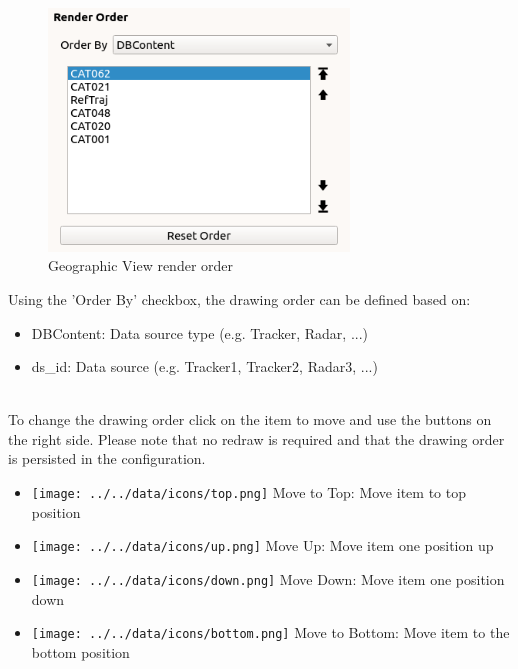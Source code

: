 \begin{figure}[H]
    \includegraphics[width=8cm,frame]{figures/geoview_render_order.png}
  \caption{Geographic View render order}
\end{figure}

Using the 'Order By' checkbox, the drawing order can be defined based on:
\begin{itemize}
 \item DBContent: Data source type (e.g. Tracker, Radar, ...)
 \item ds\_id: Data source (e.g. Tracker1, Tracker2, Radar3, ...)
\end{itemize}
\ \\

To change the drawing order click on the item to move and use the buttons on the right side. Please note that no redraw is required and that the drawing order is persisted in the configuration. \\

 \begin{itemize}
 \item \texttt{[image: ../../data/icons/top.png]} Move to Top: Move item to top position
 \item \texttt{[image: ../../data/icons/up.png]} Move Up: Move item one position up
 \item \texttt{[image: ../../data/icons/down.png]} Move Down: Move item one position down
 \item \texttt{[image: ../../data/icons/bottom.png]} Move to Bottom: Move item to the bottom position
\end{itemize}
